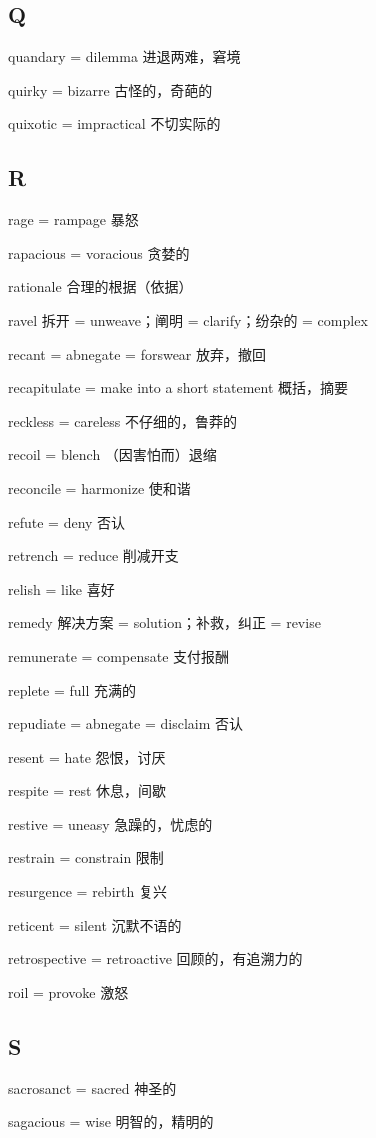 \documentclass[UTF8, fontset = none, zihao = -4, linespread = 1.1]{ctexart}
\begin{document}
\begin{multicols}{2}
\subsection*{Q}
quandary = dilemma 进退两难，窘境

quirky = bizarre 古怪的，奇葩的

quixotic = impractical 不切实际的

\subsection*{R}
rage = rampage 暴怒

rapacious = voracious 贪婪的

rationale  合理的根据（依据）

ravel 拆开 = unweave；阐明 = clarify；纷杂的 = complex

recant = abnegate =  forswear 放弃，撤回

recapitulate = make into a short statement 概括，摘要

reckless = careless 不仔细的，鲁莽的

recoil = blench （因害怕而）退缩

reconcile = harmonize 使和谐

refute = deny 否认

retrench = reduce 削减开支

relish = like 喜好

remedy 解决方案 = solution；补救，纠正 = revise

remunerate = compensate 支付报酬

replete = full 充满的

repudiate = abnegate = disclaim 否认

resent = hate 怨恨，讨厌

respite = rest 休息，间歇

restive = uneasy 急躁的，忧虑的

restrain = constrain 限制

resurgence = rebirth 复兴

reticent = silent 沉默不语的

retrospective = retroactive 回顾的，有追溯力的

roil = provoke 激怒

\subsection*{S}
sacrosanct = sacred 神圣的

sagacious = wise 明智的，精明的


\end{multicols}
\end{document}
